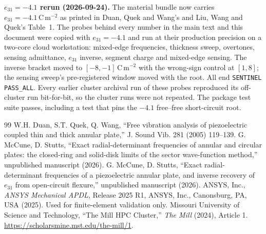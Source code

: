 \documentclass[11pt]{article}
\begin{document}
\noindent\textbf{$e_{31}=-4.1$ rerun (2026-09-24).} The material bundle
now carries $e_{31}=-4.1\,\mathrm{C\,m^{-2}}$ as printed in Duan, Quek
and Wang's and Liu, Wang and Quek's Table~1. The probes behind every
number in the main text and this document were copied with
$e_{31}=-4.1$ and run at their production precision on a two-core cloud
workstation: mixed-edge frequencies, thickness sweep, overtones, sensing
admittance, $e_{31}$ inverse, segment charge and mixed-edge sensing. The
inverse bracket moved to $[-8,-1]\,\mathrm{C\,m^{-2}}$ with the
wrong-sign control at $[1,8]$; the sensing sweep's pre-registered
window moved with the root. All end \texttt{SENTINEL PASS\_ALL}. Every
earlier cluster archival run of these probes reproduced its off-cluster
run bit-for-bit, so the cluster runs were not repeated. The package test
suite passes, including a test that pins the $-4.1$ free--free
short-circuit root.

\clearpage
\begin{thebibliography}{99}\small
\setlength{\itemsep}{0pt}
\setlength{\parsep}{0pt}
 W.H. Duan, S.T. Quek, Q. Wang, ``Free vibration analysis
of piezoelectric coupled thin and thick annular plate,'' J. Sound Vib. 281
(2005) 119--139.
 G. McCune, D. Stutts, ``Exact radial-determinant
frequencies of annular and circular plates: the closed-ring and solid-disk
limits of the sector wave-function method,'' unpublished manuscript (2026).
 G. McCune, D. Stutts, ``Exact radial-determinant
frequencies of a piezoelectric annular plate, and inverse recovery of
$e_{31}$ from open-circuit flexure,'' unpublished manuscript (2026).
 ANSYS, Inc., \emph{ANSYS Mechanical APDL}, Release 2025 R1,
ANSYS, Inc., Canonsburg, PA, USA (2025). Used for finite-element validation
only.
 Missouri University of Science and Technology, ``The Mill
HPC Cluster,'' \emph{The Mill} (2024), Article 1.
\url{https://scholarsmine.mst.edu/the-mill/1}.
\end{thebibliography}
\end{document}
